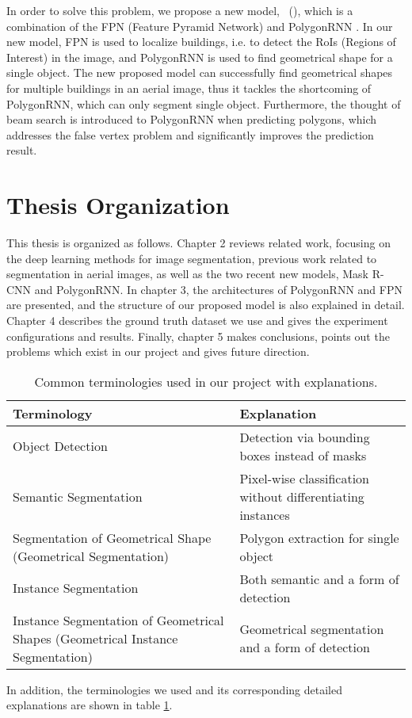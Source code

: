 In order to solve this problem, we propose a new model, \modelnameshort\ (\modelnamelong), which is a combination of the FPN (Feature Pyramid Network) \cite{fpn} and PolygonRNN \cite{polygonrnn}. In our new model, FPN is used to localize buildings, i.e. to detect the RoIs (Regions of Interest) in the image, and PolygonRNN is used to find geometrical shape for a single object. The new proposed model can successfully find geometrical shapes for multiple buildings in an aerial image, thus it tackles the shortcoming of PolygonRNN, which can only segment single object. Furthermore, the thought of beam search is introduced to PolygonRNN when predicting polygons, which addresses the false vertex problem and significantly improves the prediction result.

\newpage

\section{Thesis Organization}\label{thsorg}
This thesis is organized as follows. Chapter 2 reviews related work, focusing on the deep learning methods for image segmentation, previous work related to segmentation in aerial images, as well as the two recent new models, Mask R-CNN \cite{maskrcnn} and PolygonRNN. In chapter 3, the architectures of PolygonRNN and FPN are presented, and the structure of our proposed model is also explained in detail. Chapter 4 describes the ground truth dataset we use and gives the experiment configurations and results. Finally, chapter 5 makes conclusions, points out the problems which exist in our project and gives future direction.

\begin{table}[ht!]
	\centering
	\caption[Common terminologies used in our project with explanations]{Common terminologies used in our project with explanations.}
	\label{tab:term}
	\begin{tabularx}{\textwidth}{X|X}
	\hline
	\textbf{Terminology} & \textbf{Explanation}\\ \hline
	Object Detection & Detection via bounding boxes instead of masks \\
	Semantic Segmentation & Pixel-wise classification without differentiating instances \\
	Segmentation of Geometrical Shape (Geometrical Segmentation) & Polygon extraction for single object \\ \hline
	Instance Segmentation & Both semantic and a form of detection \\
	Instance Segmentation of Geometrical Shapes (Geometrical Instance Segmentation) & Geometrical segmentation and a form of detection \\
	\hline
	\end{tabularx}
\end{table}

In addition, the terminologies we used and its corresponding detailed explanations are shown in table \ref{tab:term}.
